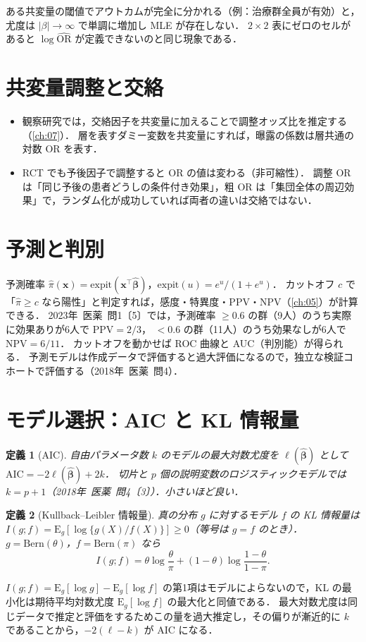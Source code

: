 \documentclass[a4paper,11pt,openany]{ltjsbook}
\newtheorem{teigi}{定義}[chapter]
\newcommand{\kakomon}[2]{\mbox{#1年 医薬 問#2}}
\newcommand{\E}{\mathrm{E}}
\newcommand{\OR}{\mathrm{OR}}
\newcommand{\transp}{^{\top}}
\begin{document}
\begin{supbox}[補足：完全分離]
ある共変量の閾値でアウトカムが完全に分かれる（例：治療群全員が有効）と，尤度は $|\beta|\to\infty$ で単調に増加し MLE が存在しない．
$2\times2$ 表にゼロのセルがあると $\log\widehat{\OR}$ が定義できないのと同じ現象である．
\end{supbox}

\section{共変量調整と交絡}\label{sec:06-adjust}
\begin{itemize}
\item 観察研究では，交絡因子を共変量に加えることで調整オッズ比を推定する（\cref{ch:07}）．
      層を表すダミー変数を共変量にすれば，曝露の係数は層共通の対数 OR を表す．
\item RCT でも予後因子で調整すると OR の値は変わる（非可縮性）．
      調整 OR は「同じ予後の患者どうしの条件付き効果」，粗 OR は「集団全体の周辺効果」で，ランダム化が成功していれば両者の違いは交絡ではない．
\end{itemize}

\section{予測と判別}\label{sec:06-predict}
予測確率 $\hat\pi(\bm x)=\mathrm{expit}(\bm x\transp\hat{\bm\beta})$，$\mathrm{expit}(u)=e^u/(1+e^u)$．
カットオフ $c$ で「$\hat\pi\ge c$ なら陽性」と判定すれば，感度・特異度・PPV・NPV（\cref{ch:05}）が計算できる．
\kakomon{2023}{1}〔5〕では，予測確率 $\ge0.6$ の群（9人）のうち実際に効果ありが6人で $\mathrm{PPV}=2/3$，
$<0.6$ の群（11人）のうち効果なしが6人で $\mathrm{NPV}=6/11$．
カットオフを動かせば ROC 曲線と AUC（判別能）が得られる．
予測モデルは作成データで評価すると過大評価になるので，独立な検証コホートで評価する（\kakomon{2018}{4}）．

\section{モデル選択：AIC と KL 情報量}\label{sec:06-aic}
\begin{teigi}[AIC]\label{def:06-aic}
自由パラメータ数 $k$ のモデルの最大対数尤度を $\ell(\hat{\bm\beta})$ として $\mathrm{AIC}=-2\ell(\hat{\bm\beta})+2k$．
切片と $p$ 個の説明変数のロジスティックモデルでは $k=p+1$（\kakomon{2018}{4}〔3〕）．小さいほど良い．
\end{teigi}
\begin{teigi}[Kullback--Leibler 情報量]\label{def:06-kl}
真の分布 $g$ に対するモデル $f$ の KL 情報量は $I(g;f)=\E_g[\log\{g(X)/f(X)\}]\ge0$（等号は $g=f$ のとき）．
$g=\mathrm{Bern}(\theta)$，$f=\mathrm{Bern}(\pi)$ なら
\begin{equation}
I(g;f)=\theta\log\frac\theta\pi+(1-\theta)\log\frac{1-\theta}{1-\pi}.\label{eq:06-kl}
\end{equation}
\end{teigi}
$I(g;f)=\E_g[\log g]-\E_g[\log f]$ の第1項はモデルによらないので，KL の最小化は期待平均対数尤度 $\E_g[\log f]$ の最大化と同値である．
最大対数尤度は同じデータで推定と評価をするためこの量を過大推定し，その偏りが漸近的に $k$ であることから，$-2(\ell-k)$ が AIC になる．
\end{document}
